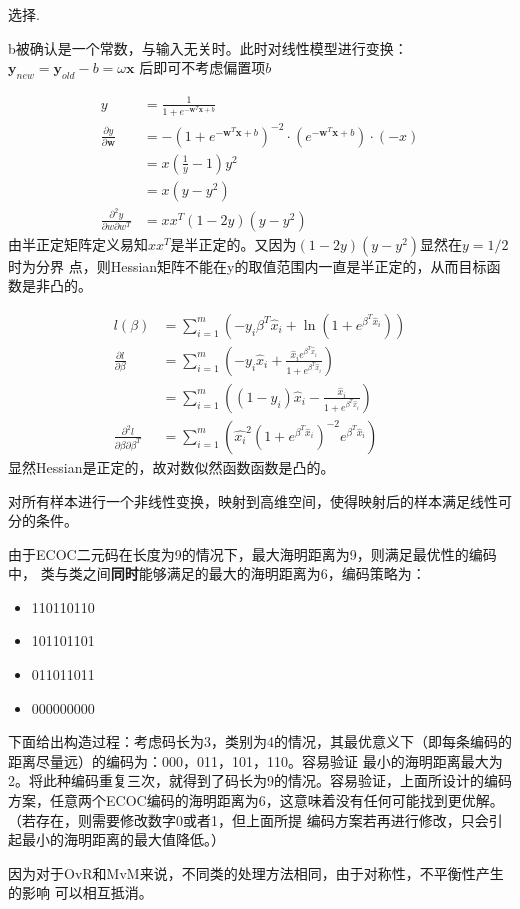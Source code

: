 \documentclass{ctexart}
\newcounter{answercnt}
\newcommand{\sCourse}{机器学习}   %
\newcommand{\nTime}{3}             %
\newcommand{\sName}{黄昊}           %
\newcommand{\sNumber}{20204205}     %
\newcommand{\homeworkTitle}{
    \setcounter{answercnt}{0}
    \begin{center}
        \fontsize{16pt}{0}{\textbf{\kaishu\sCourse课程\quad第\nTime次作业}}\\
        \fontsize{13pt}{0}{\textit{\kaishu\sName\qquad\sNumber}}\\
    \end{center}}
\begin{document}
\homeworkTitle
选择\answer[3.1]\answer[3.2]\answer[3.6]\answer[3.7]\answer[3.9].

\answer[3.1]
b被确认是一个常数，与输入无关时。此时对线性模型进行变换：$\boldsymbol{y}
_{new}=\boldsymbol{y}_{old}-{b}=\omega \boldsymbol{x}$
后即可不考虑偏置项${b}$

\answer[3.2]
\begin{equation*}
\begin{aligned}    
y&=\frac{1}{1+e^{-\boldsymbol{w}^T\boldsymbol{x}+{b}}}\\
\frac{\partial y}{\partial \boldsymbol{w}}&=-(1+e^{-\boldsymbol{w}
^T\boldsymbol{x}+{b}})^{-2}·(e^{-\boldsymbol{w}^T\boldsymbol
{x}+{b}})·(-x)\\
&={x(\frac{1}{y}-1)}{y^2}\\
&=x(y-y^2)\\
\frac{\partial^2 y}{\partial w\partial w^T}&=xx^T(1-2y)(y-y^2)
\end{aligned}
\end{equation*}
由半正定矩阵定义易知$xx^T$是半正定的。又因为$(1-2y)(y-y^2)$显然在$y=1/2$时为分界
点，则Hessian矩阵不能在y的取值范围内一直是半正定的，从而目标函数是非凸的。

$$
\begin{aligned}    
    l(\beta)&=\sum_{i=1}^{m}(-y_i\beta^T\hat{x}_i+\ln(1+e^{\beta^T\hat{x}_i}))\\
    \frac{\partial l}{\partial \beta}&=\sum_{i=1}^m(-y_i\hat {x}_i+\frac{\hat{x}_ie^{\beta^T\hat {x}_i}}{1+e^{\beta^T\hat{x}_i}})\\
    &=\sum_{i=1}^m((1-y_i)\hat {x}_i-\frac{\hat{x}_i}{1+e^{\beta^T\hat{x}_i}})\\
    \frac{\partial^2 l}{\partial \beta\partial \beta^T}&=
    \sum_{i=1}^m(\hat{x_i}^2(1+e^{\beta^T\hat{x}_i})^{-2}e^{\beta^T\hat{x}_i})
\end{aligned}
$$
显然Hessian是正定的，故对数似然函数函数是凸的。

\answer[3.6]
对所有样本进行一个非线性变换，映射到高维空间，使得映射后的样本满足线性可分的条件。

\answer[3.7]
由于ECOC二元码在长度为9的情况下，最大海明距离为9，则满足最优性的编码中，
类与类之间\textbf{同时}能够满足的最大的海明距离为6，编码策略为：

\begin{itemize}
    \item 110110110
    \item 101101101
    \item 011011011
    \item 000000000
\end{itemize}

下面给出构造过程：考虑码长为3，类别为4的情况，其最优意义下（即每条编码的距离尽量远）的编码为：000，011，101，110。容易验证
最小的海明距离最大为2。将此种编码重复三次，就得到了码长为9的情况。容易验证，上面所设计的编码方案，任意两个ECOC编码的海明距离为6，这意味着没有任何可能找到更优解。（若存在，则需要修改数字0或者1，但上面所提
编码方案若再进行修改，只会引起最小的海明距离的最大值降低。）

\answer[3.9]
因为对于OvR和MvM来说，不同类的处理方法相同，由于对称性，不平衡性产生的影响
可以相互抵消。
\end{document}
